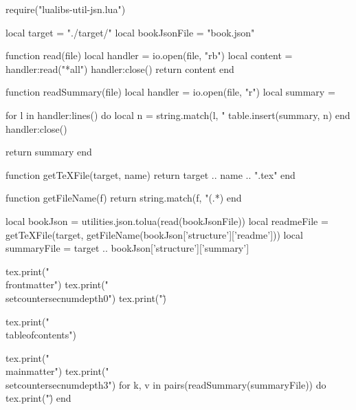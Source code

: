 \documentclass[10pt, a4paper, oneside]{ltjsbook}
\begin{document}
\begin{luacode*}
  require("lualibs-util-jsn.lua")

  local target = "./target/"
  local bookJsonFile = "book.json"

  function read(file)
    local handler = io.open(file, "rb")
    local content = handler:read("*all")
    handler:close()
    return content
  end

  function readSummary(file)
    local handler = io.open(file, "r")
    local summary = {}

    for l in handler:lines() do
      local n = string.match(l, "%
      table.insert(summary, n)
    end
    handler:close()

    return summary
  end

  function getTeXFile(target, name)
    return target .. name .. ".tex"
  end

  function getFileName(f)
    return string.match(f, "(.*)%
  end

  local bookJson = utilities.json.tolua(read(bookJsonFile))
  local readmeFile  = getTeXFile(target, getFileName(bookJson['structure']['readme']))
  local summaryFile = target .. bookJson['structure']['summary']

  tex.print("\\frontmatter")
  tex.print("\\setcounter{secnumdepth}{0}")
  tex.print("\")

  tex.print("\\tableofcontents")

  tex.print("\\mainmatter")
  tex.print("\\setcounter{secnumdepth}{3}")
  for k, v in pairs(readSummary(summaryFile)) do
    tex.print("\")
  end
\end{luacode*}
\end{document}
